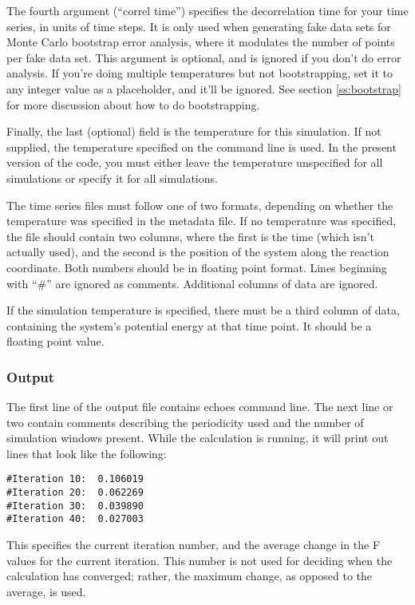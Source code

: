 \documentclass[12pt]{article}
\begin{document}
The fourth argument (``correl time'') specifies the decorrelation time for
your time series, in units of time steps.  It is only used when generating
fake data sets for Monte Carlo bootstrap error analysis, where it modulates
the number of points per fake data set.  This argument is optional, and is
ignored if you don't do error analysis.  If you're doing multiple
temperatures but not bootstrapping, set it to any integer value as a
placeholder, and it'll be ignored.  See section \ref{ss:bootstrap} for more
discussion about how to do bootstrapping.

Finally, the last (optional) field is the temperature for this simulation.  If
not supplied, the temperature specified on the command line is used.  In
the present version of the code, you must either leave the temperature
unspecified for all simulations or specify it for all simulations.  

The time series files must follow one of two formats, depending on whether
the temperature was specified in the metadata file.  If no temperature was
specified, the file should contain two columns, where the first is the time
(which isn't actually used), and the second is the position of the system
along the reaction coordinate.  Both numbers should be in floating point
format.  Lines beginning with ``\#'' are ignored as comments.  Additional
columns of data are ignored.

If the simulation temperature is specified, there must be a third column of
data, containing the system's potential energy at that time point.  It
should be a floating point value.

\subsubsection{Output}

The first line of the output file contains echoes command line.  The next
line or two contain comments describing the periodicity used and the number
of simulation windows present.  
While the calculation is running, it will print out lines that look like
the following:
\begin{verbatim}
#Iteration 10:  0.106019
#Iteration 20:  0.062269
#Iteration 30:  0.039890
#Iteration 40:  0.027003
\end{verbatim}

This specifies the current iteration number, and the average change in the
F values for the current iteration.  This number is not used for deciding
when the calculation has converged; rather, the maximum change, as opposed
to the average, is used.  
\end{document}
